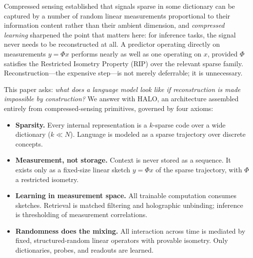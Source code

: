 \documentclass[11pt]{article}
\begin{document}
Compressed sensing \citep{candes2006robust,donoho2006compressed} established that signals sparse in some dictionary can be captured by a number of random linear measurements proportional to their information content rather than their ambient dimension, and \emph{compressed learning} \citep{calderbank2009compressed} sharpened the point that matters here: for inference tasks, the signal never needs to be reconstructed at all. A predictor operating directly on measurements $y = \Phi x$ performs nearly as well as one operating on $x$, provided $\Phi$ satisfies the Restricted Isometry Property (RIP) over the relevant sparse family. Reconstruction---the expensive step---is not merely deferrable; it is unnecessary.

This paper asks: \emph{what does a language model look like if reconstruction is made impossible by construction?} We answer with HALO, an architecture assembled entirely from compressed-sensing primitives, governed by four axioms:

\begin{itemize}
  \item[\textbf{A1}] \textbf{Sparsity.} Every internal representation is a $k$-sparse code over a wide dictionary ($k \ll N$). Language is modeled as a sparse trajectory over discrete concepts.
  \item[\textbf{A2}] \textbf{Measurement, not storage.} Context is never stored as a sequence. It exists only as a fixed-size linear sketch $y = \Phi x$ of the sparse trajectory, with $\Phi$ a restricted isometry.
  \item[\textbf{A3}] \textbf{Learning in measurement space.} All trainable computation consumes sketches. Retrieval is matched filtering and holographic unbinding; inference is thresholding of measurement correlations.
  \item[\textbf{A4}] \textbf{Randomness does the mixing.} All interaction across time is mediated by fixed, structured-random linear operators with provable isometry. Only dictionaries, probes, and readouts are learned.
\end{itemize}
\end{document}
